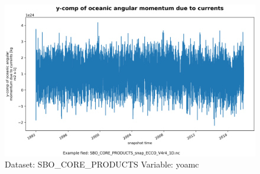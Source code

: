 \begin{figure}[H]
\centering
\includegraphics[scale=0.55]{../images/plots/oneD_plots/SBO_Core_Products/yoamc.png}
\caption{Dataset: SBO\_CORE\_PRODUCTS Variable: yoamc}
\label{tab:table-SBO_CORE_PRODUCTS_yoamc-Plot}
\end{figure}
\pagebreak
